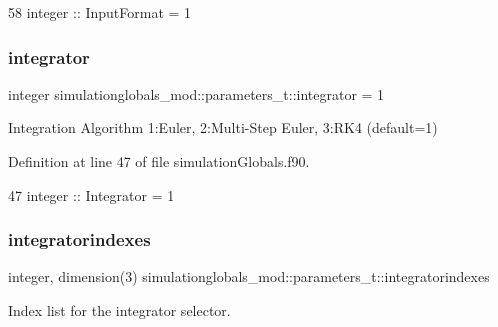 \begin{DoxyCode}
58         \textcolor{keywordtype}{integer}         :: InputFormat = 1
\end{DoxyCode}
\mbox{\label{structsimulationglobals__mod_1_1parameters__t_a1489379b1bb839280c0715470250c9f5}} 
\subsubsection{\texorpdfstring{integrator}{integrator}}
{\footnotesize\ttfamily integer simulationglobals\+\_\+mod\+::parameters\+\_\+t\+::integrator = 1\hspace{0.3cm}{\ttfamily [private]}}



Integration Algorithm 1\+:Euler, 2\+:Multi-\/\+Step Euler, 3\+:R\+K4 (default=1) 



Definition at line 47 of file simulation\+Globals.\+f90.


\begin{DoxyCode}
47         \textcolor{keywordtype}{integer}         :: Integrator = 1
\end{DoxyCode}
\mbox{\label{structsimulationglobals__mod_1_1parameters__t_adf4a0c840f5b357417f8c729f33c6428}} 
\subsubsection{\texorpdfstring{integratorindexes}{integratorindexes}}
{\footnotesize\ttfamily integer, dimension(3) simulationglobals\+\_\+mod\+::parameters\+\_\+t\+::integratorindexes\hspace{0.3cm}{\ttfamily [private]}}



Index list for the integrator selector. 



